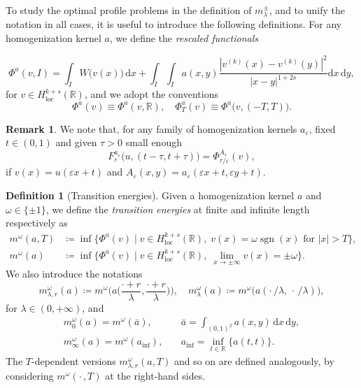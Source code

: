 \documentclass{article}
\theoremstyle{definition}
\newtheorem{Definition}[Theorem]{Definition}
\newtheorem{Remark}[Theorem]{Remark}
\newcommand{\abs}[1]{\left|#1\right|}
\newcommand{\de}{\mathrm{d}}
\newcommand{\R}{\mathbb{R}}
\newcommand{\e}{\varepsilon}
\def\e{\varepsilon}
\newcommand{\sgn}{\operatorname{sgn}}
\begin{document}
To study the optimal profile problems in the definition of $m^\pm_\lambda$, and to unify the notation in all cases, it is useful to introduce the following definitions. For any homogenization kernel $a$, we define the \emph{rescaled functionals}

\begin{equation}\label{eq:def_Phi}
    \Phi^a(v, I) = \int_I W\big(v(x)\big)\,\de x +  \int_I\int_I a(x,y ) \frac{|v^{(k)}(x)-v^{(k)}(y)|^2}{|x-y|^{1+2s}}\de x\,\de y,
\end{equation}
for $v\in H^{k+s}_{\mathrm{loc}}(\R)$, and we adopt the conventions
\[\Phi^a(v)\equiv\Phi^a(v, \R), \quad  \Phi^a_T(v)\equiv  \Phi^a\big(v, (-T,T)\big).\]

\begin{Remark}
    We note that, for any family of homogenization kernels $a_\e$, fixed $t\in (0,1)$ and given $\tau>0$ small enough 
\begin{equation*}
    F^{a_{\scriptstyle \e}}_{\e}\big(u, (t-\tau, t+\tau)\big)=\Phi^{A_{\scriptstyle\e}}_{\tau/\e}(v),
\end{equation*}
if $v(x)=u(\e x+t)$ and $A_\e(x,y)=a_\e(\e x +t,\e y+t)$.
\end{Remark}
\begin{Definition}[Transition energies]
\label{def:transition_energies}
Given a homogenization kernel $a$ and $\omega\in \{\pm 1\}$, we define the \emph{transition energies} at finite and infinite length respectively as
    \begin{align*}
        m^\omega(a,T) &\coloneqq \inf \big\{\Phi^{a}(v)\;\big|\; v\in H^{k+s}_{\operatorname{loc}}(\R), \; v(x) = \omega \sgn(x)  \text{ for } \abs{x} > T\big\},\\
         m^{\omega}(a)  &\coloneqq \inf \big\{\Phi^{a}(v)\;\big|\; v\in H^{k+s}_{\operatorname{loc}}(\R), \; \lim_{x\to \pm\infty}v(x) = \pm \omega \big\}.
    \end{align*}
We also introduce the notations
\begin{equation*}
    m_{\lambda,r}^{\omega}(a)\coloneqq m^\omega\Big(a\Big(\frac{\cdot+r}{\lambda},\frac{\cdot+r}{\lambda}\Big)\Big), \quad m_\lambda^{\omega}(a)\coloneqq m^\omega\big(a(\cdot\,/\lambda,\, \cdot\,/\lambda)\big),
\end{equation*}
 for $\lambda \in (0,+\infty)$, and
 \begin{equation*}
\begin{split}
    m^\omega_0(a)=m^\omega(\bar a), \quad  &\bar a=\int_{(0,1)^2}a(x,y)\,\de x\,\de y,\\
    m^\omega_\infty(a)=m^\omega(a_{\inf}),\quad  &a_{\inf}=\inf_{t\in \R}\{a(t,t)\}.
\end{split}
\end{equation*}
The $T$-dependent versions $m_{\lambda,r}^{\omega}(a, T)$ and so on are defined analogously, by considering $m^\omega(\cdot\,, T)$ at the right-hand sides.
\end{Definition}
\end{document}
